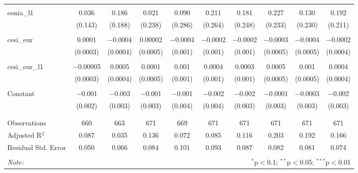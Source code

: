 \begin{table}[!htbp]
\begin{adjustbox}{width=1.35\textwidth}
\begin{tabular}{@{\extracolsep{5pt}}lccccccccc}
  & & & & & & & & & \\ 
 eonia\_l1 & 0.036 & 0.186 & 0.021 & 0.090 & 0.211 & 0.181 & 0.227 & 0.130 & 0.192 \\ 
  & (0.143) & (0.188) & (0.238) & (0.286) & (0.264) & (0.248) & (0.233) & (0.230) & (0.211) \\ 
  & & & & & & & & & \\ 
 cesi\_eur & 0.0001 & $-$0.0004 & 0.00002 & $-$0.0004 & $-$0.0002 & $-$0.0002 & $-$0.0003 & $-$0.0004 & $-$0.0002 \\ 
  & (0.0003) & (0.0004) & (0.0005) & (0.001) & (0.001) & (0.001) & (0.0005) & (0.0005) & (0.0004) \\ 
  & & & & & & & & & \\ 
 cesi\_eur\_l1 & $-$0.00005 & 0.0005 & 0.0001 & 0.001 & 0.0004 & 0.0003 & 0.0005 & 0.001 & 0.0004 \\ 
  & (0.0003) & (0.0004) & (0.0005) & (0.001) & (0.001) & (0.001) & (0.0005) & (0.0005) & (0.0004) \\ 
  & & & & & & & & & \\ 
 Constant & $-$0.001 & $-$0.003 & $-$0.001 & $-$0.001 & $-$0.002 & $-$0.002 & $-$0.0001 & $-$0.0003 & $-$0.002 \\ 
  & (0.002) & (0.003) & (0.003) & (0.004) & (0.004) & (0.003) & (0.003) & (0.003) & (0.003) \\ 
  & & & & & & & & & \\ 
\hline \\[-1.8ex] 
Observations & 660 & 663 & 671 & 669 & 671 & 671 & 671 & 671 & 671 \\ 
Adjusted R$^{2}$ & 0.087 & 0.035 & 0.136 & 0.072 & 0.085 & 0.116 & 0.203 & 0.192 & 0.166 \\ 
Residual Std. Error & 0.050 & 0.066 & 0.084 & 0.101 & 0.093 & 0.087 & 0.082 & 0.081 & 0.074 \\ 
\hline 
\hline \\[-1.8ex] 
\textit{Note:}  & \multicolumn{9}{r}{$^{*}$p$<$0.1; $^{**}$p$<$0.05; $^{***}$p$<$0.01} \\ 
\end{tabular} 
\end{adjustbox}
\end{table} 
